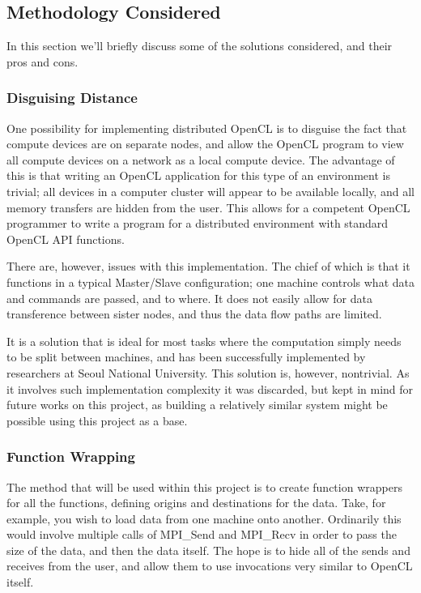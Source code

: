 \documentclass[../thesis.tex]{subfiles}
\begin{document}
    \subsection{Methodology Considered} %
    \label{sub:methodology_considered}
    In this section we'll briefly discuss some of the solutions considered, and their pros and cons.
        \subsubsection{Disguising Distance} %
        \label{ssub:disguising_distance}
            One possibility for implementing distributed OpenCL is to disguise the fact that compute devices are on separate nodes, and allow the OpenCL program to view all compute devices on a network as a local compute device. The advantage of this is that writing an OpenCL application for this type of an environment is trivial; all devices in a computer cluster will appear to be available locally, and all memory transfers are hidden from the user. This allows for a competent OpenCL programmer to write a program for a distributed environment with standard OpenCL API functions.

            There are, however, issues with this implementation. The chief of which is that it functions in a typical Master/Slave configuration; one machine controls what data and commands are passed, and to where. It does not easily allow for data transference between sister nodes, and thus the data flow paths are limited.

            It is a solution that is ideal for most tasks where the computation simply needs to be split between machines, and has been successfully implemented by researchers at Seoul National University\cite{Kim:2012:SOF:2304576.2304623}. This solution is, however, nontrivial. As it involves such implementation complexity it was discarded, but kept in mind for future works on this project, as building a relatively similar system might be possible using this project as a base.
        \subsubsection{Function Wrapping} %
        \label{ssub:function_wrapping}
            The method that will be used within this project is to create function wrappers for all the functions, defining origins and destinations for the data. Take, for example, you wish to load data from one machine onto another. Ordinarily this would involve multiple calls of MPI\_Send and MPI\_Recv in order to pass the size of the data, and then the data itself. The hope is to hide all of the sends and receives from the user, and allow them to use invocations very similar to OpenCL itself.
\end{document}
